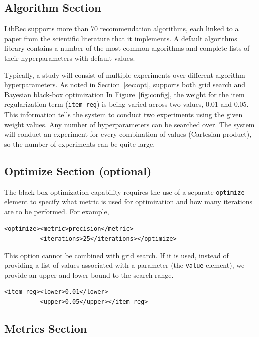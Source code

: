 \subsection{Algorithm Section}
\label{subsec:libauto_algos}
LibRec supports more than 70 recommendation algorithms, each linked to a paper from the scientific literature that it implements. A default algorithms library contains a number of the most common algorithms and complete lists of their hyperparameters with default values.

Typically, a study will consist of multiple experiments over different algorithm hyperparameters. As noted in Section~\ref{sec:opt}, \libauto{} supports both grid search and Bayesian black-box optimization In Figure~\ref{fig:config}, the weight for the item regularization term (\texttt{item-reg}) is being varied across two values, 0.01 and 0.05. This information tells the system to conduct two experiments using the given weight values. Any number of hyperparameters can be searched over. The system will conduct an experiment for every combination of values (Cartesian product), so the number of experiments can be quite large.

\subsection{Optimize Section (optional)}
\label{subsec:libauto_opt}
The black-box optimization capability requires the use of a separate \texttt{optimize} element to specify what metric is used for optimization and how many iterations are to be performed. For example,

{\small
\begin{verbatim}
<optimize><metric>precision</metric>
          <iterations>25</iterations></optimize>
\end{verbatim}}

This option cannot be combined with grid search. If it is used, instead of providing a list of values associated with a parameter (the \texttt{value} element), we provide an upper and lower bound to the search range.

{\small
\begin{verbatim}
<item-reg><lower>0.01</lower>
          <upper>0.05</upper></item-reg>
\end{verbatim}}

\subsection{Metrics Section}
\label{subsec:libauto_metrics}

